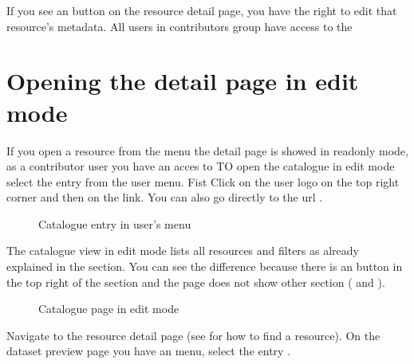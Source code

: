 \documentclass[letterpaper,10pt,english]{sphinxmanual}
\begin{document}
\sphinxAtStartPar
If you see an  button on the resource detail page, you have the right to edit
that resource’s metadata. All users in contributors group have access to the


\section{Opening the detail page in edit mode}
\label{\detokenize{03_managing_metadata:opening-the-detail-page-in-edit-mode}}
\sphinxAtStartPar
If you open a resource from the  menu the detail page is showed in read\sphinxhyphen{}only mode, as a contributor user you have an acces to
TO open the catalogue in edit mode select the  entry from the user menu.
Fist Click on the user logo  on the top right corner and then on the   link.
You can also go directly to the url .

\begin{figure}[htbp]
\centering
\capstart

\noindent{}
\caption{Catalogue entry in user’s menu}\label{\detokenize{03_managing_metadata:id1}}\end{figure}

\sphinxAtStartPar
The catalogue view in edit mode lists all resources and filters as already explained in the {\hyperref[\detokenize{02_find_and_visualize:find-en}]{}}
section. You can see the difference because there is an  button in the top right
of the section and the page does not show other section ( and ).

\begin{figure}[htbp]
\centering
\capstart

\noindent{}
\caption{Catalogue page in edit mode}\label{\detokenize{03_managing_metadata:id2}}\end{figure}

\sphinxAtStartPar
Navigate to the resource detail page (see {\hyperref[\detokenize{02_find_and_visualize:advanced-filter}]{}} for how to find a resource).
On the dataset preview page you have an   menu, select the entry .
\end{document}
